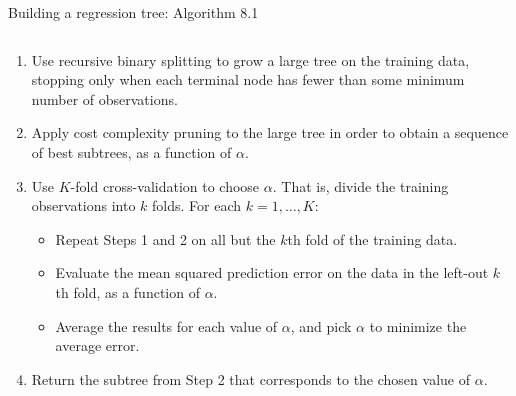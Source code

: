 \documentclass[10pt,ignorenonframetext,]{beamer}
\providecommand{\tightlist}{%
  \setlength{\itemsep}{0pt}\setlength{\parskip}{0pt}}
\begin{document}
\begin{frame}

\begin{block}{Building a regression tree: Algorithm 8.1}

\(~\)

\begin{enumerate}
\tightlist
\item
  Use recursive binary splitting to grow a large tree on the training
  data, stopping only when each terminal node has fewer than some
  minimum number of observations.
\end{enumerate}

\vspace{2mm}

\begin{enumerate}
\setcounter{enumi}{1}
\tightlist
\item
  Apply cost complexity pruning to the large tree in order to obtain a
  sequence of best subtrees, as a function of \(\alpha\).
\end{enumerate}

\vspace{2mm}

\begin{enumerate}
\setcounter{enumi}{2}
\tightlist
\item
  Use \(K\)-fold cross-validation to choose \(\alpha\). That is, divide
  the training observations into \(k\) folds. For each
  \(k = 1,\ldots, K\):

  \begin{itemize}
  \tightlist
  \item
    Repeat Steps 1 and 2 on all but the \(k\)th fold of the training
    data.
  \item
    Evaluate the mean squared prediction error on the data in the
    left-out \(k\)th fold, as a function of \(\alpha\).
  \item
    Average the results for each value of \(\alpha\), and pick
    \(\alpha\) to minimize the average error.
  \end{itemize}
\end{enumerate}

\vspace{2mm}

\begin{enumerate}
\setcounter{enumi}{3}
\tightlist
\item
  Return the subtree from Step 2 that corresponds to the chosen value of
  \(\alpha\).
\end{enumerate}

\end{block}

\end{frame}
\end{document}
